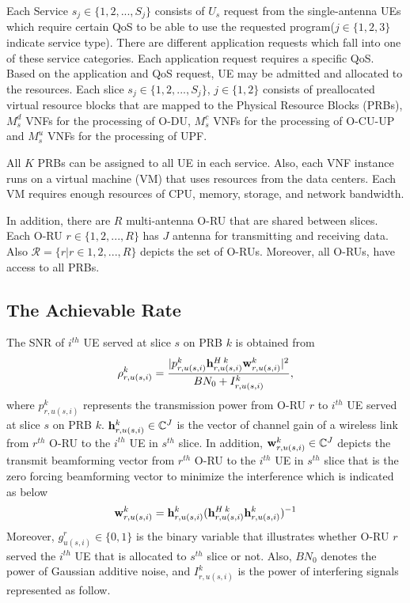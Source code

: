 \documentclass[conference]{IEEEtran}
\begin{document}
Each Service $s_j\in \{1,2,...,S_j\} $ consists of $U_{s}$ request from the single-antenna UEs which require certain QoS to be able to use the requested program($j \in \{1,2,3\}$ indicate service type).
There are different application requests which fall into one of these service categories. Each application request requires a specific QoS. Based on the application and QoS request, UE may be admitted and allocated to the resources.
Each slice $s_j \in \{1,2,...,S_j \}$, $j \in \{1,2\}$ consists of  preallocated virtual resource blocks that are mapped to the Physical Resource Blocks (PRBs), $M_s^{d}$ VNFs for the processing of O-DU, $M_s^{c}$ VNFs for the processing of O-CU-UP and $M_s^{u}$ VNFs for the processing of UPF.

All $K$ PRBs can be assigned to all UE in each service.
Also, each VNF instance runs on a virtual machine (VM) that uses resources from the data centers. Each VM requires enough resources of CPU, memory, storage, and network bandwidth.

In addition, there are $R$ multi-antenna O-RU that are shared between slices. Each O-RU $r \in \{1,2,...,R \}$
has $J$ antenna for transmitting and receiving data. Also $\mathcal{R} = \{ r | r\in 1,2,...,R \}$ depicts the set of O-RUs. Moreover, all O-RUs, have access to all PRBs.

\subsection{The Achievable Rate}
The SNR of $i^{th}$ UE served at slice $s$ on PRB $k$ is obtained from
\begin{equation}\label{eq1}
\rho_{r,u(s,i)}^{k} =  \frac{|p_{r,u(s,i)}^{k}{\bold{h}_{r,u(s,i)}^{H \: k}} \bold{w}_{r,u(s,i)}^{k}|^2}{BN_0 + I_{r,u(s,i)}^{k}},
\end{equation} 
where $p_{r,u(s,i)}^{k}$ represents the transmission power from O-RU $r$ to $i^{th}$ UE served at slice $s$ on PRB $k$. 
${\bold{h}_{r,u(s,i)}^{k}} \in \mathbb{C}^{J}$ is the vector of channel gain of a wireless link from 
$r^{th}$ O-RU to the $i^{th}$ UE in $s^{th}$ slice. In addition, $\bold{w}_{r,u(s,i)}^{k} \in \mathbb{C}^{J}$ depicts the  transmit beamforming vector from $r^{th}$ O-RU to the $i^{th}$ UE in $s^{th}$ slice that is the zero forcing beamforming vector to minimize the interference which is indicated as below
\begin{equation}
\bold{w}_{r,u(s,i)}^{k} = {\bold{h}_{r,u(s,i)}^{k}}({\bold{h}_{r,u(s,i)}^{H \: k}} {\bold{h}_{r,u(s,i)}^{k}})^{-1}
\end{equation}
Moreover, $g_{u(s,i)}^r \in \{0,1\}$ is the binary variable that illustrates whether O-RU $r$ served the $i^{th}$ UE that is allocated to $s^{th}$ slice or not. 
Also, $BN_0$ denotes the power of Gaussian additive noise, and $I_{r,u(s,i)}^{k}$ is the power of interfering signals represented as follow.
\end{document}
